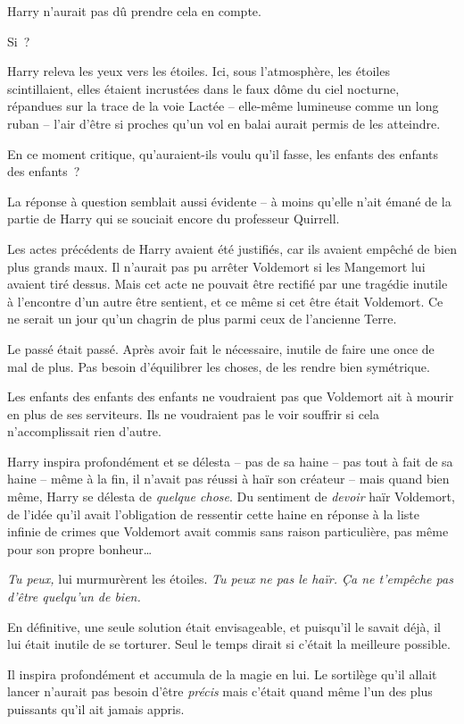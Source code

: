 Harry n'aurait pas dû prendre cela en compte.

Si~?

Harry releva les yeux vers les étoiles. Ici, sous l'atmosphère, les étoiles scintillaient, elles étaient incrustées dans le faux dôme du ciel nocturne, répandues sur la trace de la voie Lactée -- elle-même lumineuse comme un long ruban -- l'air d'être si proches qu'un vol en balai aurait permis de les atteindre.

En ce moment critique, qu'auraient-ils voulu qu'il fasse, les enfants des enfants des enfants~?

La réponse à question semblait aussi évidente -- à moins qu'elle n'ait émané de la partie de Harry qui se souciait encore du professeur Quirrell.

Les actes précédents de Harry avaient été justifiés, car ils avaient empêché de bien plus grands maux. Il n'aurait pas pu arrêter Voldemort si les Mangemort lui avaient tiré dessus. Mais cet acte ne pouvait être rectifié par une tragédie inutile à l'encontre d'un autre être sentient, et ce même si cet être était Voldemort. Ce ne serait un jour qu'un chagrin de plus parmi ceux de l'ancienne Terre.

Le passé était passé. Après avoir fait le nécessaire, inutile de faire une once de mal de plus. Pas besoin d'équilibrer les choses, de les rendre bien symétrique.

Les enfants des enfants des enfants ne voudraient pas que Voldemort ait à mourir en plus de ses serviteurs. Ils ne voudraient pas le voir souffrir si cela n'accomplissait rien d'autre.

Harry inspira profondément et se délesta -- pas de sa haine -- pas tout à fait de sa haine -- même à la fin, il n'avait pas réussi à haïr son créateur -- mais quand bien même, Harry se délesta de \emph{quelque chose}. Du sentiment de \emph{devoir} haïr Voldemort, de l'idée qu'il avait l'obligation de ressentir cette haine en réponse à la liste infinie de crimes que Voldemort avait commis sans raison particulière, pas même pour son propre bonheur…

\emph{Tu peux,} lui murmurèrent les étoiles. \emph{Tu peux ne pas le haïr. Ça ne t'empêche pas d'être quelqu'un de bien.}

En définitive, une seule solution était envisageable, et puisqu'il le savait déjà, il lui était inutile de se torturer. Seul le temps dirait si c'était la meilleure possible.

Il inspira profondément et accumula de la magie en lui. Le sortilège qu'il allait lancer n'aurait pas besoin d'être \emph{précis} mais c'était quand même l'un des plus puissants qu'il ait jamais appris.

